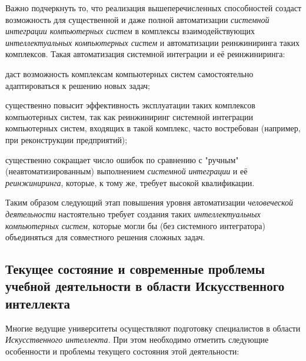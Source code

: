 Важно подчеркнуть то, что реализация вышеперечисленных способностей создаст возможность для существенной и даже полной автоматизации \textit{системной интеграции компьютерных систем} в комплексы взаимодействующих \textit{интеллектуальных компьютерных систем} и автоматизации реинжиниринга таких комплексов. Такая автоматизация системной интеграции и её реинжиниринга:

\begin{textitemize}
	\item
	даст возможность комплексам компьютерных систем самостоятельно адаптироваться к решению новых задач;
	\item
	существенно повысит эффективность эксплуатации таких комплексов компьютерных систем, так как реинжиниринг системной интеграции компьютерных систем, входящих в такой комплекс, часто востребован (например, при реконструкции предприятий);
	\item
	существенно сокращает число ошибок по сравнению с "ручным"{} (неавтоматизированным) выполнением \textit{системной} \textit{интеграции} и её \textit{реинжиниринга}, которые, к тому же, требует высокой квалификации.
\end{textitemize}

Таким образом следующий этап повышения уровня автоматизации \textit{человеческой деятельности} настоятельно требует создания таких \textit{интеллектуальных компьютерных систем}, которые могли бы  (без системного интегратора) объединяться для совместного решения сложных задач.

\subsection{Текущее состояние и современные проблемы учебной деятельности в области Искусственного интеллекта}
\label{subsec_current_state_and_modern_problems_educational_activity}

Многие ведущие университеты осуществляют подготовку специалистов в области \textit{Искусственного интеллекта}. При этом необходимо отметить следующие особенности и проблемы текущего состояния этой деятельности:

